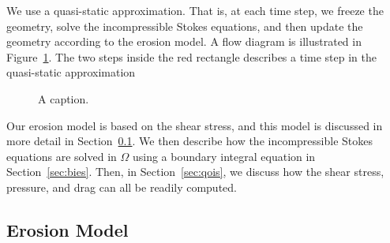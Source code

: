 \documentclass[preprint, 10pt]{elsarticle}
\begin{document}
We use a quasi-static approximation.  That is, at each time step, we
freeze the geometry, solve the incompressible Stokes equations, and then
update the geometry according to the erosion model.  A flow diagram is
illustrated in Figure~\ref{fig:workflow}.  The two steps inside the red
rectangle describes a time step in the quasi-static approximation
\begin{figure}[htpb]
  \centering
  
  \caption{\label{fig:workflow}A caption.}
\end{figure}

Our erosion model is based on the shear stress, and this model is
discussed in more detail in Section~\ref{sec:erosion}.  We then describe
how the incompressible Stokes equations are solved in $\Omega$ using a
boundary integral equation in Section~\ref{sec:bies}.  Then, in
Section~\ref{sec:qois}, we discuss how the shear stress, pressure, and
drag can all be readily computed.  


\subsection{Erosion Model} 
\label{sec:erosion}


\end{document}
